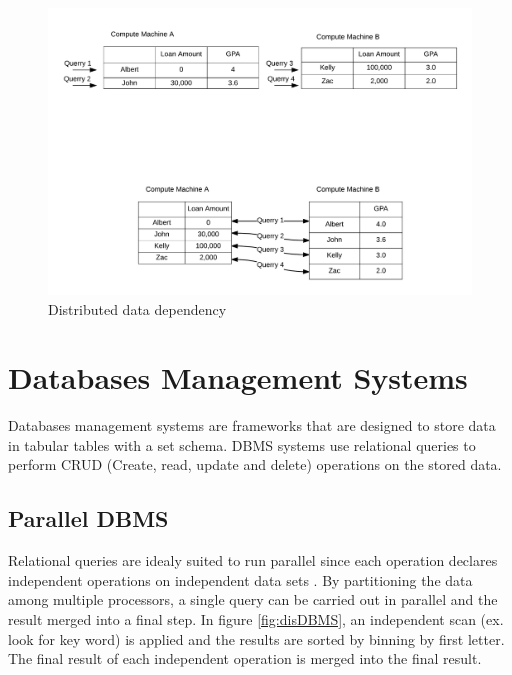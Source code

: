 \documentclass[10pt,twocolumn]{IEEEtran11}
\begin{document}
\begin{figure}[h]
\centering
\includegraphics[scale=0.12]{images/parallelComputation.png}
\caption{Distributed data dependency}
\label{fig:distDataDependency}
\end{figure}

\section{Databases Management Systems}

Databases management systems are frameworks that are designed to store data in tabular tables with a set schema.  DBMS systems use relational queries to perform CRUD 
 (Create, read, update and delete) operations on the stored data.  


\subsection{Parallel DBMS}

Relational queries are idealy suited to run parallel since each operation declares independent operations on independent data sets \cite{dewitt1992parallel}.  By partitioning the data among multiple processors, a single query can be carried out in parallel and the result merged into a final step.  In figure \ref{fig:disDBMS}, an independent scan (ex. look for key word) is applied and the results are sorted by binning by first letter. The final result of each independent operation is merged into the final result.
\end{document}
